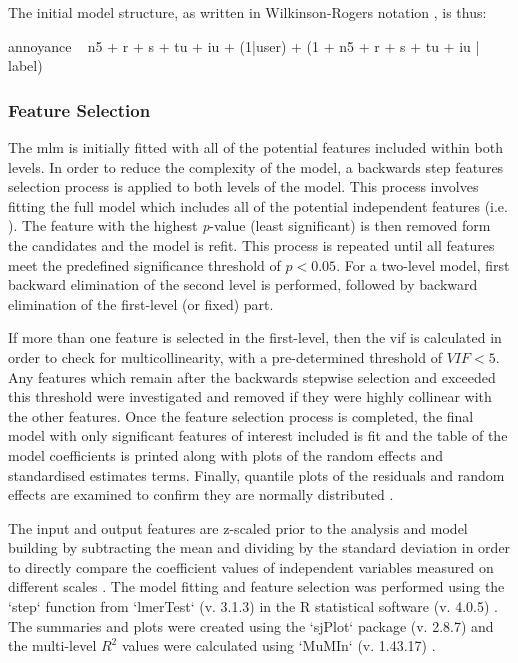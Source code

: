 The initial model structure, as written in Wilkinson-Rogers notation , is thus:

annoyance ~ \gls{n5} + \gls{r} + \gls{s} + \gls{tu} + \gls{iu} + (1|user) + (1 + \gls{n5} + \gls{r} + \gls{s} + \gls{tu} + \gls{iu} | label)

\subsubsection{Feature Selection}

The \gls{mlm} is initially fitted with all of the potential features included within both levels. In order to reduce the complexity of the model, a backwards step features selection process is applied to both levels of the model. This process involves fitting the full model which includes all of the potential independent features (i.e. ). The feature with the highest \emph{p}-value (least significant) is then removed form the candidates and the model is refit. This process is repeated until all features meet the predefined significance threshold of $p < 0.05 $. For a two-level model, first backward elimination of the second level is performed, followed by backward elimination of the first-level (or fixed) part.

If more than one feature is selected in the first-level, then the \gls{vif} is calculated in order to check for multicollinearity, with a pre-determined threshold of $VIF<5$. Any features which remain after the backwards stepwise selection and exceeded this threshold were investigated and removed if they were highly collinear with the other features. Once the feature selection process is completed, the final model with only significant features of interest included is fit and the table of the model coefficients is printed along with plots of the random effects and standardised estimates terms. Finally, quantile plots of the residuals and random effects are examined to confirm they are normally distributed .

The input and output features are z-scaled prior to the analysis and model building by subtracting the mean and dividing by the standard deviation in order to directly compare the coefficient values of independent variables measured on different scales . The model fitting and feature selection was performed using the `step` function from `lmerTest` (v. 3.1.3)  in the R statistical software (v. 4.0.5) . The summaries and plots were created using the `sjPlot` package (v. 2.8.7)  and the multi-level $R^2$ values were calculated using `MuMIn` (v. 1.43.17) .

